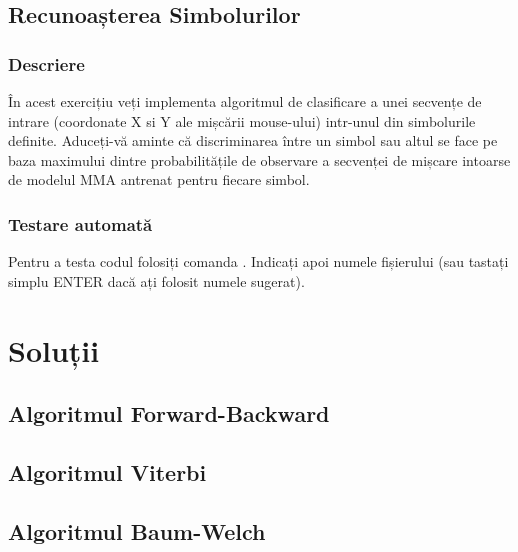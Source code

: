 \documentclass[12pt]{article}
\begin{document}
\subsection{Recunoașterea Simbolurilor}
\label{sec:symbol-recognition}


\subsubsection{Descriere}
În acest exercițiu veți implementa algoritmul de clasificare a unei secvențe de intrare (coordonate X si Y ale mișcării mouse-ului) intr-unul din simbolurile definite.
Aduceți-vă aminte că discriminarea între un simbol sau altul se face pe baza maximului dintre probabilitățile de observare a secvenței de mișcare intoarse de modelul MMA antrenat pentru fiecare simbol.

\subsubsection{Testare automată}
\label{sec:testare-ultima}

Pentru a testa codul folosiți comanda .
Indicați apoi numele fișierului (sau tastați simplu ENTER dacă ați
folosit numele sugerat).


\section{Soluții}
\label{sec:solutions}

\subsection{Algoritmul Forward-Backward}
\label{sec:fb-sol}



\subsection{Algoritmul Viterbi}
\label{sec:viterbi-sol}



\subsection{Algoritmul Baum-Welch}
\label{sec:baum-welch-sol}
\end{document}

